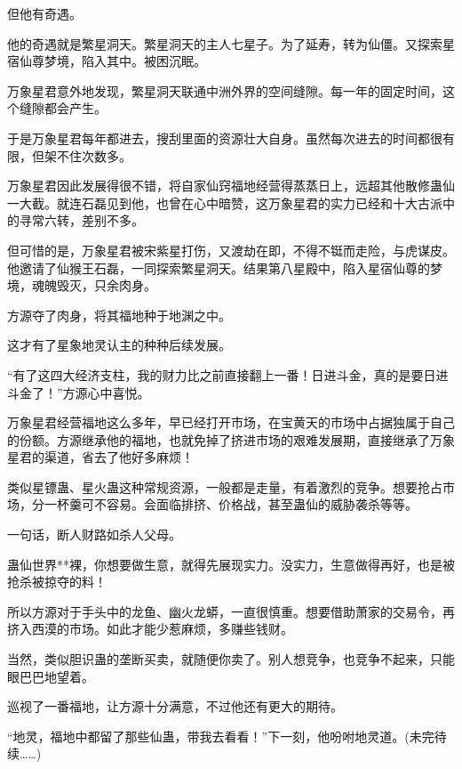 \begin{this_body}
但他有奇遇。

他的奇遇就是繁星洞天。繁星洞天的主人七星子。为了延寿，转为仙僵。又探索星宿仙尊梦境，陷入其中。被困沉眠。

万象星君意外地发现，繁星洞天联通中洲外界的空间缝隙。每一年的固定时间，这个缝隙都会产生。

于是万象星君每年都进去，搜刮里面的资源壮大自身。虽然每次进去的时间都很有限，但架不住次数多。

万象星君因此发展得很不错，将自家仙窍福地经营得蒸蒸日上，远超其他散修蛊仙一大截。就连石磊见到他，也曾在心中暗赞，这万象星君的实力已经和十大古派中的寻常六转，差别不多。

但可惜的是，万象星君被宋紫星打伤，又渡劫在即，不得不铤而走险，与虎谋皮。他邀请了仙猴王石磊，一同探索繁星洞天。结果第八星殿中，陷入星宿仙尊的梦境，魂魄毁灭，只余肉身。

方源夺了肉身，将其福地种于地渊之中。

这才有了星象地灵认主的种种后续发展。

“有了这四大经济支柱，我的财力比之前直接翻上一番！日进斗金，真的是要日进斗金了！”方源心中喜悦。

万象星君经营福地这么多年，早已经打开市场，在宝黄天的市场中占据独属于自己的份额。方源继承他的福地，也就免掉了挤进市场的艰难发展期，直接继承了万象星君的渠道，省去了他好多麻烦！

类似星镖蛊、星火蛊这种常规资源，一般都是走量，有着激烈的竞争。想要抢占市场，分一杯羹可不容易。会面临排挤、价格战，甚至蛊仙的威胁袭杀等等。

一句话，断人财路如杀人父母。

蛊仙世界**裸，你想要做生意，就得先展现实力。没实力，生意做得再好，也是被抢杀被掠夺的料！

所以方源对于手头中的龙鱼、幽火龙蟒，一直很慎重。想要借助萧家的交易令，再挤入西漠的市场。如此才能少惹麻烦，多赚些钱财。

当然，类似胆识蛊的垄断买卖，就随便你卖了。别人想竞争，也竞争不起来，只能眼巴巴地望着。

巡视了一番福地，让方源十分满意，不过他还有更大的期待。

“地灵，福地中都留了那些仙蛊，带我去看看！”下一刻，他吩咐地灵道。(未完待续……)

\end{this_body}

